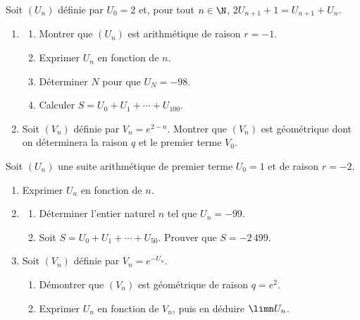\begin{annales}
Soit $\left(U_{n}\right)$ définie par $U_{0} = 2$ et, pour tout
$n \in \N$, $2U_{n+1}+1 = U_{n+1}+U_{n}$.
\begin{enumerate}[label=\textbf{\arabic*)}, leftmargin=*, itemsep=0.15em]
  \item \begin{enumerate}[label=\textbf{\alph*)}, leftmargin=1.4em]
          \item Montrer que $\left(U_{n}\right)$ est arithmétique de raison
                $r = -1$.
          \item Exprimer $U_{n}$ en fonction de $n$.
          \item Déterminer $N$ pour que $U_{N} = -98$.
          \item Calculer $S = U_{0}+U_{1}+\cdots+U_{100}$.
        \end{enumerate}
  \item Soit $\left(V_{n}\right)$ définie par $V_{n} = e^{2-n}$. Montrer que
        $\left(V_{n}\right)$ est géométrique dont on déterminera la raison
        $q$ et le premier terme $V_{0}$.
\end{enumerate}

Soit $\left(U_{n}\right)$ une suite arithmétique de premier terme
$U_{0} = 1$ et de raison $r = -2$.
\begin{enumerate}[label=\textbf{\arabic*)}, leftmargin=*, itemsep=0.15em]
  \item Exprimer $U_{n}$ en fonction de $n$.
  \item \begin{enumerate}[label=\textbf{\alph*)}, leftmargin=1.4em]
          \item Déterminer l'entier naturel $n$ tel que $U_{n} = -99$.
          \item Soit $S = U_{0}+U_{1}+\cdots+U_{50}$. Prouver que
                $S = -2\,499$.
        \end{enumerate}
  \item Soit $\left(V_{n}\right)$ définie par $V_{n} = e^{-U_{n}}$.
        \begin{enumerate}[label=\textbf{\alph*)}, leftmargin=1.4em]
          \item Démontrer que $\left(V_{n}\right)$ est géométrique de raison
                $q = e^{2}$.
          \item Exprimer $U_{n}$ en fonction de $V_{n}$, puis en déduire
                $\limn U_{n}$.
        \end{enumerate}
\end{enumerate}


\end{annales}
